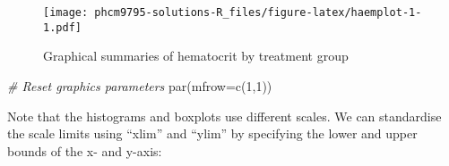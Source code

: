 \documentclass[
]{memoir}
\newenvironment{Shaded}{\begin{snugshade}}{\end{snugshade}}
\newcommand{\AttributeTok}[1]{\textcolor[rgb]{0.77,0.63,0.00}{#1}}
\newcommand{\CommentTok}[1]{\textcolor[rgb]{0.56,0.35,0.01}{\textit{#1}}}
\newcommand{\DecValTok}[1]{\textcolor[rgb]{0.00,0.00,0.81}{#1}}
\newcommand{\FunctionTok}[1]{\textcolor[rgb]{0.00,0.00,0.00}{#1}}
\newcommand{\NormalTok}[1]{#1}
\newcommand{\SpecialCharTok}[1]{\textcolor[rgb]{0.00,0.00,0.00}{#1}}
\newcommand{\StringTok}[1]{\textcolor[rgb]{0.31,0.60,0.02}{#1}}
\begin{document}
\begin{figure}
\centering
\texttt{[image: phcm9795-solutions-R\_files/figure-latex/haemplot-1-1.pdf]}
\caption{\label{fig:haemplot-1}Graphical summaries of hematocrit by treatment group}
\end{figure}

\begin{Shaded}
\begin{Highlighting}[]
\CommentTok{\# Reset graphics parameters}
\FunctionTok{par}\NormalTok{(}\AttributeTok{mfrow=}\FunctionTok{c}\NormalTok{(}\DecValTok{1}\NormalTok{,}\DecValTok{1}\NormalTok{))}
\end{Highlighting}
\end{Shaded}

Note that the histograms and boxplots use different scales. We can standardise the scale limits using ``xlim'' and ``ylim'' by specifying the lower and upper bounds of the x- and y-axis:

\begin{Shaded}
\end{Shaded}
\end{document}
